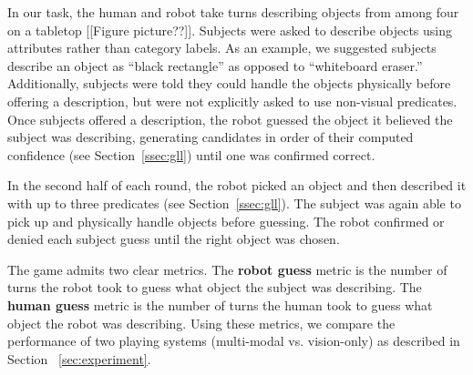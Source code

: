 In our \ispy task, the human and robot take turns describing objects from among four on a tabletop [[Figure picture??]].
Subjects were asked to describe objects using attributes rather than category labels.
As an example, we suggested subjects describe an object as ``black rectangle'' as opposed to ``whiteboard eraser.''
Additionally, subjects were told they could handle the objects physically before offering a description, but were not explicitly asked to use non-visual predicates.
Once subjects offered a description, the robot guessed the object it believed the subject was describing, generating candidates in order of their computed confidence (see Section~\ref{ssec:gll}) until one was confirmed correct.

In the second half of each round, the robot picked an object and then described it with up to three predicates (see Section~\ref{ssec:gll}).
The subject was again able to pick up and physically handle objects before guessing.
The robot confirmed or denied each subject guess until the right object was chosen.

The \ispy game admits two clear metrics.
The \textbf{robot guess} metric is the number of turns the robot took to guess what object the subject was describing.
The \textbf{human guess} metric is the number of turns the human took to guess what object the robot was describing.
Using these metrics, we compare the performance of two \ispy playing systems (multi-modal vs. vision-only) as described in Section ~\ref{sec:experiment}.

